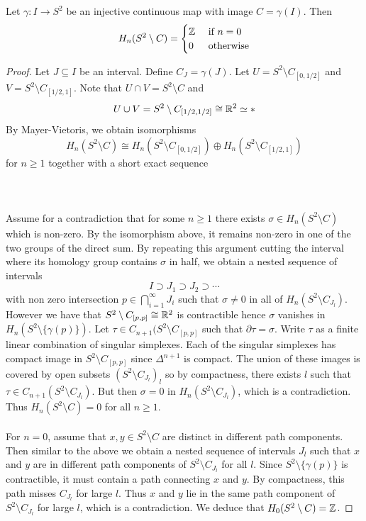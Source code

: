 \documentclass[a4paper]{article}
\begin{document}
\begin{lmm}{}{} Let $\gamma:I\to S^2$ be an injective continuous map with image $C=\gamma(I)$. Then $$H_n(S^2\setminus C)=\begin{cases}
\mathbb{Z} & \text{ if } n=0\\
0 & \text{ otherwise}
\end{cases}$$ \tcbline
\begin{proof}
Let $J\subseteq I$ be an interval. Define $C_J=\gamma(J)$. Let $U=S^2\setminus C_{[0,1/2]}$ and $V=S^2\setminus C_{[1/2,1]}$. Note that $U\cap V=S^2\setminus C$ and $$U\cup V=S^2\setminus C_{[1/2,1/2]}\cong\mathbb{R}^2\simeq\ast$$ By Mayer-Vietoris, we obtain isomorphisms $$H_n(S^2\setminus C)\cong H_n(S^2\setminus C_{[0,1/2]})\oplus H_n(S^2\setminus C_{[1/2,1]})$$ for $n\geq 1$ together with a short exact sequence \\~\\
\\~\\
Assume for a contradiction that for some $n\geq 1$ there exists $\sigma\in H_n(S^2\setminus C)$ which is non-zero. By the isomorphism above, it remains non-zero in one of the two groups of the direct sum. By repeating this argument cutting the interval where its homology group contains $\sigma$ in half, we obtain a nested sequence of intervals $$I\supset J_1\supset J_2\supset\cdots$$ with non zero intersection $p\in\bigcap_{i=1}^\infty J_i$ such that $\sigma\neq 0$ in all of $H_n(S^2\setminus C_{J_l})$. However we have that $S^2\setminus C_{[p,p]}\cong\mathbb{R}^2$ is contractible hence $\sigma$ vanishes in $H_n(S^2\setminus\{\gamma(p)\})$. Let $\tau\in C_{n+1}(S^2\setminus C_{[p,p]}$ such that $\partial\tau=\sigma$. Write $\tau$ as a finite linear combination of singular simplexes. Each of the singular simplexes has compact image in $S^2\setminus C_{[p,p]}$ since $\Delta^{n+1}$ is compact. The union of these images is covered by open subsets $(S^2\setminus C_{J_l})_l$ so by compactness, there exists $l$ such that $\tau\in C_{n+1}(S^2\setminus C_{J_l})$. But then $\sigma=0$ in $H_n(S^2\setminus C_{J_l})$, which is a contradiction. Thus $H_n(S^2\setminus C)=0$ for all $n\geq 1$. \\~\\

For $n=0$, assume that $x,y\in S^2\setminus C$ are distinct in different path components. Then similar to the above we obtain a nested sequence of intervals $J_l$ such that $x$ and $y$ are in different path components of $S^2\setminus C_{J_l}$ for all $l$. Since $S^2\setminus\{\gamma(p)\}$ is contractible, it must contain a path connecting $x$ and $y$. By compactness, this path misses $C_{J_l}$ for large $l$. Thus $x$ and $y$ lie in the same path component of $S^2\setminus C_{J_l}$ for large $l$, which is a contradiction. We deduce that $H_0(S^2\setminus C)=\mathbb{Z}$. 
\end{proof}
\end{lmm}
\end{document}
